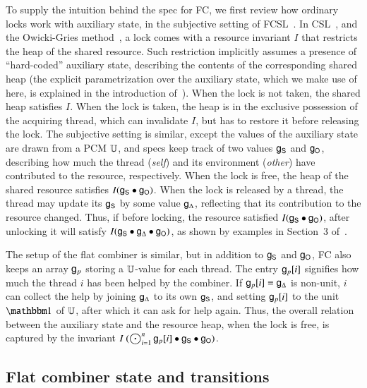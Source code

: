 To supply the intuition behind the spec for FC, we first review how
ordinary locks work with auxiliary state, in the subjective setting of
FCSL~\cite{Nanevski-al:ESOP14}. In CSL~\cite{OHearn:TCS07}, and the
Owicki-Gries method~\cite{Owicki-Gries:CACM76}, a lock comes with a
resource invariant $I$ that restricts the heap of the shared
resource. Such restriction implicitly assumes a presence of
``hard-coded'' auxiliary state, describing the contents of the
corresponding shared heap (the explicit parametrization over the
auxiliary state, which we make use of here, is explained in the
introduction of~\cite{LeyWild-Nanevski:POPL13}). When the lock is not
taken, the shared heap satisfies $I$. When the lock is taken, the heap
is in the exclusive possession of the acquiring thread, which can
invalidate $I$, but has to restore it before releasing the lock. The
subjective setting is similar, except the values of the auxiliary
state are drawn from a PCM $\mathbb{U}$, and specs keep track of two values
$\mathsf{g}_{{\mathsf{S}}}$ and $\mathsf{g}_{{\mathsf{O}}}$, describing how much the thread (\emph{self}) and its
environment (\emph{other}) have contributed to the resource,
respectively. When the lock is free, the heap of the shared resource
satisfies $I(\mathsf{g}_{{\mathsf{S}}} \bullet \mathsf{g}_{{\mathsf{O}}})$. When the lock is released by a thread,
the thread may update its $\mathsf{g}_{{\mathsf{S}}}$ by some value $\mathsf{g}_{\Delta}$, reflecting that
its contribution to the resource changed. Thus, if before locking, the
resource satisfied $I(\mathsf{g}_{{\mathsf{S}}} \bullet \mathsf{g}_{{\mathsf{O}}})$, after unlocking it will satisfy
$I(\mathsf{g}_{{\mathsf{S}}} \bullet \mathsf{g}_{\Delta} \bullet \mathsf{g}_{{\mathsf{O}}})$, as shown by examples in Section~3
of~\cite{Nanevski-al:ESOP14}.

The setup of the flat combiner is similar, but in addition to $\mathsf{g}_{{\mathsf{S}}}$
and $\mathsf{g}_{{\mathsf{O}}}$, FC also keeps an array $\mathsf{g}_{p}$ storing a $\mathbb{U}$-value for
each thread. The entry $\mathsf{g}_{p}[i]$ signifies how much the thread $i$ has
been helped by the combiner. If $\mathsf{g}_{p}[i]=\mathsf{g}_{\Delta}$ is non-unit, $i$ can
collect the help by joining $\mathsf{g}_{\Delta}$ to its own $\mathsf{g}_{{\mathsf{S}}}$, and setting
$\mathsf{g}_{p}[i]$ to the unit $\pcmU$ of $\mathbb{U}$, after which it can ask for
help again. Thus, the overall relation between the auxiliary state and
the resource heap, when the lock is free, is captured by the invariant
$I~(\bigodot_{i=1}^n\mathsf{g}_{p}[i] \bullet \mathsf{g}_{{\mathsf{S}}} \bullet \mathsf{g}_{{\mathsf{O}}})$.

\subsection{Flat combiner state and transitions}


